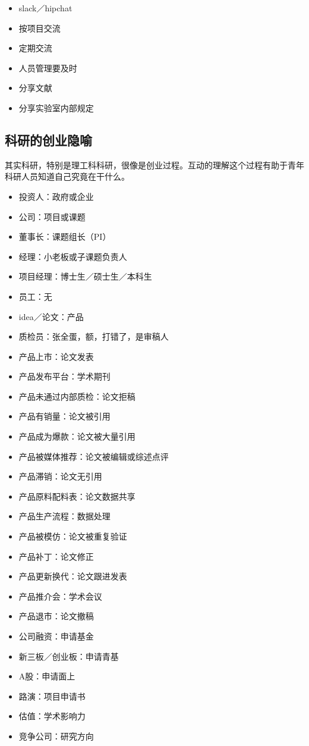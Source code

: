 \documentclass[]{book}
\providecommand{\tightlist}{%
  \setlength{\itemsep}{0pt}\setlength{\parskip}{0pt}}
\begin{document}
\begin{itemize}
\tightlist
\item
  slack／hipchat
\item
  按项目交流
\item
  定期交流
\item
  人员管理要及时
\item
  分享文献
\item
  分享实验室内部规定
\end{itemize}

\subsection{科研的创业隐喻}

其实科研，特别是理工科科研，很像是创业过程。互动的理解这个过程有助于青年科研人员知道自己究竟在干什么。

\begin{itemize}
\item
  投资人：政府或企业
\item
  公司：项目或课题
\item
  董事长：课题组长（PI）
\item
  经理：小老板或子课题负责人
\item
  项目经理：博士生／硕士生／本科生
\item
  员工：无
\item
  idea／论文：产品
\item
  质检员：张全蛋，额，打错了，是审稿人
\item
  产品上市：论文发表
\item
  产品发布平台：学术期刊
\item
  产品未通过内部质检：论文拒稿
\item
  产品有销量：论文被引用
\item
  产品成为爆款：论文被大量引用
\item
  产品被媒体推荐：论文被编辑或综述点评
\item
  产品滞销：论文无引用
\item
  产品原料配料表：论文数据共享
\item
  产品生产流程：数据处理
\item
  产品被模仿：论文被重复验证
\item
  产品补丁：论文修正
\item
  产品更新换代：论文跟进发表
\item
  产品推介会：学术会议
\item
  产品退市：论文撤稿
\item
  公司融资：申请基金
\item
  新三板／创业板：申请青基
\item
  A股：申请面上
\item
  路演：项目申请书
\item
  估值：学术影响力
\item
  竞争公司：研究方向
\end{itemize}
\end{document}
